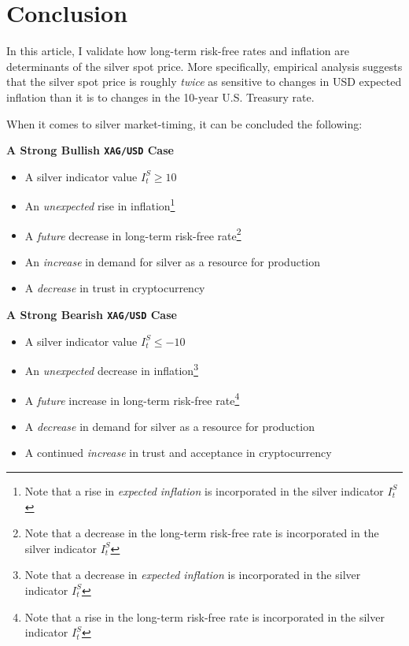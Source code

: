 \documentclass[
  12pt,
]{article}
\providecommand{\tightlist}{%
  \setlength{\itemsep}{0pt}\setlength{\parskip}{0pt}}
\begin{document}
\newpage

\hypertarget{conclusion}{%
\section{Conclusion}\label{conclusion}}

In this article, I validate how long-term risk-free rates and inflation
are determinants of the silver spot price. More specifically, empirical
analysis suggests that the silver spot price is roughly \emph{twice} as
sensitive to changes in USD expected inflation than it is to changes in
the 10-year U.S. Treasury rate.

When it comes to silver market-timing, it can be concluded the
following:

\textbf{A Strong Bullish \texttt{XAG/USD} Case}

\begin{itemize}
\tightlist
\item
  A silver indicator value \(I^S_t \geq 10\)
\item
  An \emph{unexpected} rise in inflation\footnote{Note that a rise in
    \emph{expected inflation} is incorporated in the silver indicator
    \(I^S_t\)}
\item
  A \emph{future} decrease in long-term risk-free rate\footnote{Note
    that a decrease in the long-term risk-free rate is incorporated in
    the silver indicator \(I^S_t\)}
\item
  An \emph{increase} in demand for silver as a resource for production
\item
  A \emph{decrease} in trust in cryptocurrency
\end{itemize}

\textbf{A Strong Bearish \texttt{XAG/USD} Case}

\begin{itemize}
\tightlist
\item
  A silver indicator value \(I^S_t \leq -10\)
\item
  An \emph{unexpected} decrease in inflation\footnote{Note that a
    decrease in \emph{expected inflation} is incorporated in the silver
    indicator \(I^S_t\)}
\item
  A \emph{future} increase in long-term risk-free rate\footnote{Note
    that a rise in the long-term risk-free rate is incorporated in the
    silver indicator \(I^S_t\)}
\item
  A \emph{decrease} in demand for silver as a resource for production
\item
  A continued \emph{increase} in trust and acceptance in cryptocurrency
\end{itemize}
\end{document}
